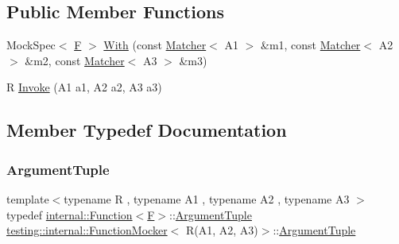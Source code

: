 \subsection*{Public Member Functions}
\begin{DoxyCompactItemize}
\item 
Mock\+Spec$<$ \mbox{\hyperlink{classtesting_1_1internal_1_1_function_mocker_3_01_r_07_a1_00_01_a2_00_01_a3_08_4_a8c471830f963b8012785eb3eeca2cc9c}{F}} $>$ \mbox{\hyperlink{classtesting_1_1internal_1_1_function_mocker_3_01_r_07_a1_00_01_a2_00_01_a3_08_4_a06fc66e2e75ff98d257966e7234bb833}{With}} (const \mbox{\hyperlink{classtesting_1_1_matcher}{Matcher}}$<$ A1 $>$ \&m1, const \mbox{\hyperlink{classtesting_1_1_matcher}{Matcher}}$<$ A2 $>$ \&m2, const \mbox{\hyperlink{classtesting_1_1_matcher}{Matcher}}$<$ A3 $>$ \&m3)
\item 
R \mbox{\hyperlink{classtesting_1_1internal_1_1_function_mocker_3_01_r_07_a1_00_01_a2_00_01_a3_08_4_a2afad9e39ca64acc6b178fa415907c5b}{Invoke}} (A1 a1, A2 a2, A3 a3)
\end{DoxyCompactItemize}


\subsection{Member Typedef Documentation}
\mbox{\label{classtesting_1_1internal_1_1_function_mocker_3_01_r_07_a1_00_01_a2_00_01_a3_08_4_a347dcf4c054a5f1fbd0e2f0ad1c5e2f3}} 
\subsubsection{\texorpdfstring{ArgumentTuple}{ArgumentTuple}}
{\footnotesize\ttfamily template$<$typename R , typename A1 , typename A2 , typename A3 $>$ \\
typedef \mbox{\hyperlink{structtesting_1_1internal_1_1_function}{internal\+::\+Function}}$<$\mbox{\hyperlink{classtesting_1_1internal_1_1_function_mocker_3_01_r_07_a1_00_01_a2_00_01_a3_08_4_a8c471830f963b8012785eb3eeca2cc9c}{F}}$>$\+::\mbox{\hyperlink{classtesting_1_1internal_1_1_function_mocker_3_01_r_07_a1_00_01_a2_00_01_a3_08_4_a347dcf4c054a5f1fbd0e2f0ad1c5e2f3}{Argument\+Tuple}} \mbox{\hyperlink{classtesting_1_1internal_1_1_function_mocker}{testing\+::internal\+::\+Function\+Mocker}}$<$ R(A1, A2, A3)$>$\+::\mbox{\hyperlink{classtesting_1_1internal_1_1_function_mocker_3_01_r_07_a1_00_01_a2_00_01_a3_08_4_a347dcf4c054a5f1fbd0e2f0ad1c5e2f3}{Argument\+Tuple}}}

